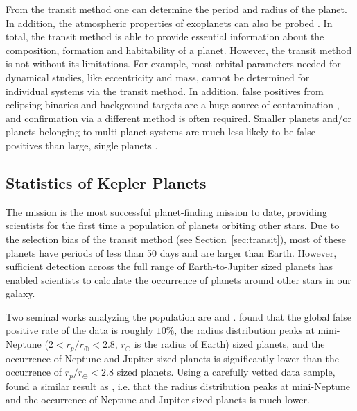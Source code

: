 From the transit method one can determine the period and radius of the planet. 
In addition, the atmospheric properties of exoplanets can also be probed \citep{Kreidberg2014, Tsiaras2016, Stevenson2016}.
In total, the transit method is able to provide essential information about the composition, formation and habitability of a planet. 
However, the transit method is not without its limitations. 
For example, most orbital parameters needed for dynamical studies, like eccentricity and mass, cannot be determined for individual systems via the transit method.
In addition, false positives from eclipsing binaries and background targets are a huge source of contamination \citep{Fressin2013}, and confirmation via a different method is often required. 
Smaller planets and/or planets belonging to multi-planet systems are much less likely to be false positives than large, single planets \citep{Fressin2013}.

\subsection{Statistics of Kepler Planets}
\label{sec:stats}
The \kep mission is the most successful planet-finding mission to date, providing scientists for the first time a population of planets orbiting other stars. 
Due to the selection bias of the transit method (see Section~\ref{sec:transit}), most of these planets have periods of less than 50 days and are larger than Earth. 
However, sufficient detection across the full range of Earth-to-Jupiter sized planets has enabled scientists to calculate the occurrence of planets around other stars in our galaxy. 

Two seminal works analyzing the \kep population are \citet{Fressin2013} and \citet{Petigura2013}.
\citet{Fressin2013} found that the global false positive rate of the \kep data is roughly $10\%$, the radius distribution peaks at mini-Neptune ($2<r_p/r_{\oplus}<2.8$, $r_{\oplus}$ is the radius of Earth) sized planets, and the occurrence of Neptune and Jupiter sized planets is significantly lower than the occurrence of $r_p/r_{\oplus}<2.8$ sized planets.
Using a carefully vetted data sample, \citet{Petigura2013} found a similar result as \citet{Fressin2013}, i.e. that the radius distribution peaks at mini-Neptune and the occurrence of Neptune and Jupiter sized planets is much lower.

